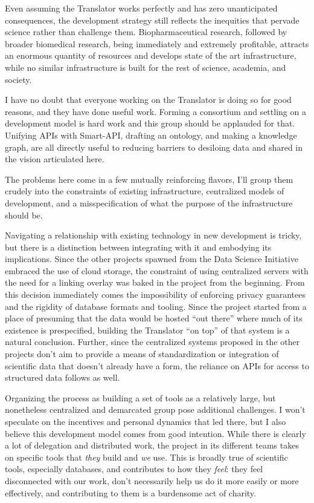 \documentclass[10pt]{article}
\begin{document}
\begin{multicols}{2}
Even assuming the Translator works perfectly and has zero unanticipated
consequences, the development strategy still reflects the inequities
that pervade science rather than challenge them. Biopharmaceutical
research, followed by broader biomedical research, being immediately and
extremely profitable, attracts an enormous quantity of resources and
develops state of the art infrastructure, while no similar
infrastructure is built for the rest of science, academia, and society.

I have no doubt that everyone working on the Translator is doing so for
good reasons, and they have done useful work. Forming a consortium and
settling on a development model is hard work and this group should be
applauded for that. Unifying APIs with Smart-API, drafting an ontology,
and making a knowledge graph, are all directly useful to reducing
barriers to desiloing data and shared in the vision articulated here.

The problems here come in a few mutually reinforcing flavors, I'll group
them crudely into the constraints of existing infrastructure,
centralized models of development, and a misspecification of what the
purpose of the infrastructure should be.

Navigating a relationship with existing technology in new development is
tricky, but there is a distinction between integrating with it and
embodying its implications. Since the other projects spawned from the
Data Science Initiative embraced the use of cloud storage, the
constraint of using centralized servers with the need for a linking
overlay was baked in the project from the beginning. From this decision
immediately comes the impossibility of enforcing privacy guarantees and
the rigidity of database formats and tooling. Since the project started
from a place of presuming that the data would be hosted ``out there''
where much of its existence is prespecified, building the Translator
``on top'' of that system is a natural conclusion. Further, since the
centralized systems proposed in the other projects don't aim to provide
a means of standardization or integration of scientific data that
doesn't already have a form, the reliance on APIs for access to
structured data follows as well.

Organizing the process as building a set of tools as a relatively large,
but nonetheless centralized and demarcated group pose additional
challenges. I won't speculate on the incentives and personal dynamics
that led there, but I also believe this development model comes from
good intention. While there is clearly a lot of delegation and
distributed work, the project in its different teams takes on specific
tools that \emph{they} build and \emph{we} use. This is broadly true of
scientific tools, especially databases, and contributes to how they
\emph{feel}: they feel disconnected with our work, don't necessarily
help us do it more easily or more effectively, and contributing to them
is a burdensome act of charity.


\end{multicols}
\end{document}
